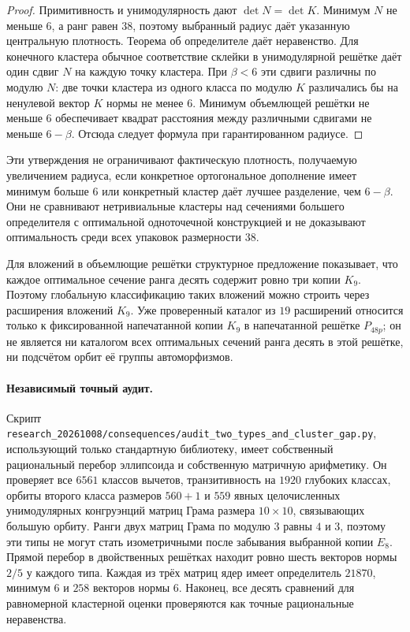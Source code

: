 \documentclass[11pt,a4paper]{article}
\theoremstyle{remark}\newtheorem{remark}[theorem]{Замечание}
\newcommand{\file}[1]{{\small\nolinkurl{#1}}}
\begin{document}
\begin{proof}
Примитивность и унимодулярность дают $\det N=\det K$.
Минимум $N$ не меньше $6$, а ранг равен $38$, поэтому выбранный радиус
даёт указанную центральную плотность. Теорема об определителе даёт
неравенство. Для конечного кластера обычное соответствие склейки
в унимодулярной решётке даёт один сдвиг $N$ на каждую точку кластера.
При $\beta<6$ эти сдвиги различны по модулю $N$: две точки кластера
из одного класса по модулю $K$ различались бы на ненулевой вектор $K$
нормы не менее $6$. Минимум объемлющей решётки не меньше $6$ обеспечивает
квадрат расстояния между различными сдвигами не меньше $6-\beta$.
Отсюда следует формула при гарантированном радиусе.
\end{proof}

Эти утверждения не ограничивают фактическую плотность, получаемую
увеличением радиуса, если конкретное ортогональное дополнение имеет
минимум больше $6$ или конкретный кластер даёт лучшее разделение,
чем $6-\beta$. Они не сравнивают нетривиальные кластеры над сечениями
большего определителя с оптимальной одноточечной конструкцией
и не доказывают оптимальность среди всех упаковок размерности $38$.

Для вложений в объемлющие решётки структурное предложение показывает,
что каждое оптимальное сечение ранга десять содержит ровно три копии
$K_9$. Поэтому глобальную классификацию таких вложений можно строить
через расширения вложений $K_9$. Уже проверенный каталог из $19$
расширений относится только к фиксированной напечатанной копии
$K_9$ в напечатанной решётке $P_{48p}$; он не является ни каталогом
всех оптимальных сечений ранга десять в этой решётке, ни подсчётом
орбит её группы автоморфизмов.

\paragraph{Независимый точный аудит.}
Скрипт \file{research_20261008/consequences/audit_two_types_and_cluster_gap.py}, использующий
только стандартную библиотеку, имеет собственный рациональный перебор
эллипсоида и собственную матричную арифметику. Он проверяет все $6561$
классов вычетов, транзитивность на $1920$ глубоких классах, орбиты
второго класса размеров $560+1$ и $559$ явных целочисленных
унимодулярных конгруэнций матриц Грама размера $10\times10$, связывающих
большую орбиту. Ранги двух матриц Грама по модулю $3$ равны $4$ и $3$,
поэтому эти типы не могут стать изометричными после забывания выбранной
копии $E_8$. Прямой перебор в двойственных решётках находит ровно шесть
векторов нормы $2/5$ у каждого типа. Каждая из трёх матриц ядер имеет
определитель $21870$, минимум $6$ и $258$ векторов нормы $6$.
Наконец, все десять сравнений для равномерной кластерной оценки
проверяются как точные рациональные неравенства.
\end{document}
